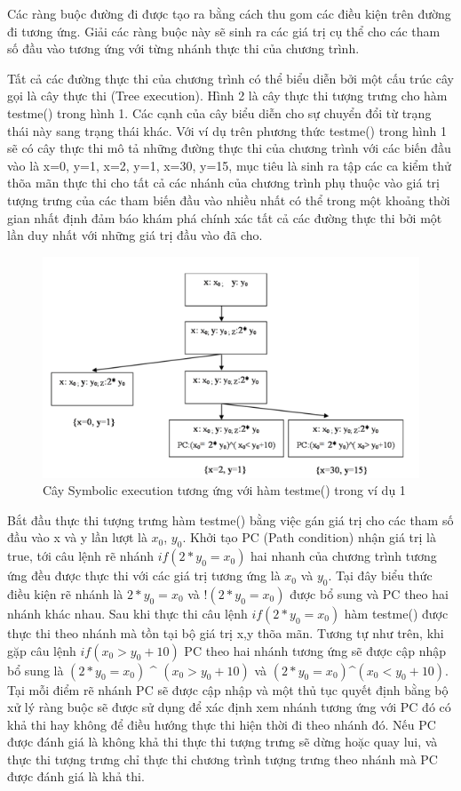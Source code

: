 \documentclass[12pt,a4paper]{article}
\begin{document}
\indent Các ràng buộc đường đi được tạo ra bằng cách thu gom các điều kiện trên đường đi tương ứng. Giải các ràng buộc này sẽ sinh ra các giá trị cụ thể cho các tham số đầu vào tương ứng với từng nhánh thực thi của chương trình.

\indent Tất cả các đường thực thi của chương trình có thể biểu diễn bởi một cấu trúc cây gọi là cây thực thi (Tree execution). Hình 2 là cây thực thi tượng trưng cho hàm testme() trong hình 1. Các cạnh của cây biểu diễn cho sự chuyển đổi từ trạng thái này sang trạng thái khác. Với ví dụ trên phương thức testme() trong hình 1 sẽ có cây thực thi mô tả những đường thực thi của chương trình với các biến đầu vào là {x=0, y=1}, {x=2, y=1}, {x=30, y=15}, mục tiêu là sinh ra tập các ca kiểm thử thõa mãn thực thi cho tất cả các nhánh của chương trình phụ thuộc vào giá trị tượng trưng của các tham biến đầu vào nhiều nhất có thể trong một khoảng thời gian nhất định đảm báo khám phá chính xác tất cả các đường thực thi bởi một lần duy nhất với những giá trị đầu vào đã cho.

\begin{figure}[ht]
\begin{center}
\includegraphics{hinhanh/hinh2}
\end{center}
\caption{Cây Symbolic execution tương ứng với hàm testme() trong ví dụ 1}
\end{figure}

\indent Bắt đầu thực thi tượng trưng hàm testme() bằng việc gán giá trị cho các tham số đầu vào x và y lần lượt là $x_0$, $y_0$. Khởi tạo PC (Path condition) nhận giá trị là true, tới câu lệnh rẽ nhánh $if(2*y_0=x_0)$ hai nhanh của chương trình tương ứng đều được thực thi với các giá trị tương ứng là $x_0$ và $y_0$. Tại đây biểu thức điều kiện rẽ nhánh là $2*y_0=x_0$ và $!(2*y_0=x_0)$ được bổ sung và PC theo hai nhánh khác nhau. Sau khi thực thi câu lệnh $if(2*y_0=x_0)$ hàm testme() được thực thi theo nhánh mà tồn tại bộ giá trị x,y thõa mãn. Tương tự như trên, khi gặp câu lệnh $if(x_0>y_0+10)$ PC theo hai nhánh tương ứng sẽ được cập nhập bổ sung là $(2*y_0=x_0)$ \^{} $(x_0>y_0+10)$ và $(2*y_0=x_0)$\^{}$(x_0<y_0+10)$. Tại mỗi điểm rẽ nhánh PC sẽ được cập nhập và một thủ tục quyết định bằng bộ xử lý ràng buộc sẽ được sử dụng để xác định xem nhánh tương ứng với PC đó có khả thi hay không để điều hướng thực thi hiện thời đi theo nhánh đó. Nếu PC được đánh giá là không khả thi thực thi tượng trưng sẽ dừng hoặc quay lui, và thực thi tượng trưng chỉ thực thi chương trình tượng trưng theo nhánh mà PC được đánh giá là khả thi.
\end{document}
